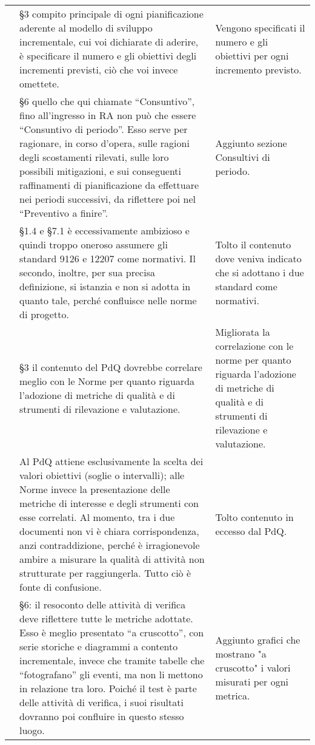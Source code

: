 {\begin{longtable}{ C{2cm} C{6cm} C{6cm}}
		\PdP & §3 compito principale di ogni pianificazione aderente al modello di sviluppo incrementale, cui voi dichiarate di aderire, è specificare il numero e gli obiettivi degli incrementi previsti, ciò che voi invece omettete. & Vengono specificati il numero e gli obiettivi per ogni incremento previsto.\\
		
		\PdP & §6 quello che qui chiamate “Consuntivo”, fino all’ingresso in RA non può che essere “Consuntivo di periodo”. Esso serve per ragionare, in corso d’opera, sulle ragioni degli scostamenti rilevati, sulle loro possibili mitigazioni, e sui conseguenti raffinamenti di pianificazione da effettuare nei periodi successivi, da riflettere poi nel “Preventivo a finire”. & Aggiunto sezione Consultivi di periodo.\\
		
		\PdQ & §1.4 e §7.1 è eccessivamente ambizioso e quindi troppo oneroso assumere gli standard 9126 e 12207 come normativi. Il secondo, inoltre, per sua precisa definizione, si istanzia e non si adotta in quanto tale, perché confluisce nelle norme di progetto.  & Tolto il contenuto dove veniva indicato che si adottano i due standard come normativi. \\
		
		\PdQ & §3 il contenuto del PdQ dovrebbe correlare meglio con le
		Norme per quanto riguarda l’adozione di metriche di qualità e di strumenti di
		rilevazione e valutazione. & Migliorata la correlazione con le norme per quanto riguarda l'adozione di metriche di qualità e di strumenti di
		rilevazione e valutazione.\\
		
		\PdQ & Al PdQ attiene esclusivamente la scelta dei valori obiettivi (soglie o intervalli); alle Norme invece la presentazione delle metriche di interesse e degli strumenti con esse correlati. Al momento, tra i due documenti non vi è chiara corrispondenza, anzi contraddizione, perché è irragionevole ambire a misurare la qualità di attività non strutturate per raggiungerla. Tutto ciò è fonte di confusione. & Tolto contenuto in eccesso dal PdQ.\\
		
		\PdQ & §6: il resoconto delle attività di verifica deve riflettere tutte le metriche adottate. Esso è meglio presentato “a cruscotto”, con serie storiche e diagrammi a contento incrementale, invece che tramite tabelle che “fotografano” gli eventi, ma non li mettono in relazione tra loro. Poiché il test è parte delle attività di verifica, i suoi risultati dovranno poi confluire in questo stesso luogo. & Aggiunto grafici che mostrano "a cruscotto" i valori misurati per ogni metrica.\\
		\hline
		

\end{longtable}}
